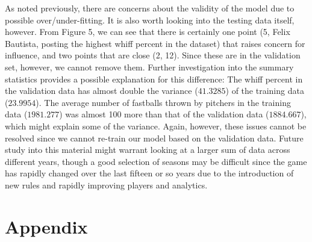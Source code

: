 \documentclass[12pt]{article}
\begin{document}
As noted previously, there are concerns about the validity of the model due to possible over/under-fitting. It is also worth looking into the testing data itself, however. From Figure 5, we can see that there is certainly one  point (5, Felix Bautista, posting the highest whiff percent in the dataset) that raises concern for influence, and two points that are close (2, 12). Since these are in the validation set, however, we cannot remove them. Further investigation into the summary statistics provides a possible explanation for this difference: The whiff percent in the validation data has almost double the variance ($41.3285$) of the training data ($23.9954$). The average number of fastballs thrown by pitchers in the training data ($1981.277$) was almost 100 more than that of the validation data ($1884.667$), which might explain some of the variance. Again, however, these issues cannot be resolved since we cannot re-train our model based on the validation data. Future study into this material might warrant looking at a larger sum of data across different years, though a good selection of seasons may be difficult since the game has rapidly changed over the last fifteen or so years due to the introduction of new rules and rapidly improving players and analytics. 






\newpage

\section{Appendix}
\end{document}
